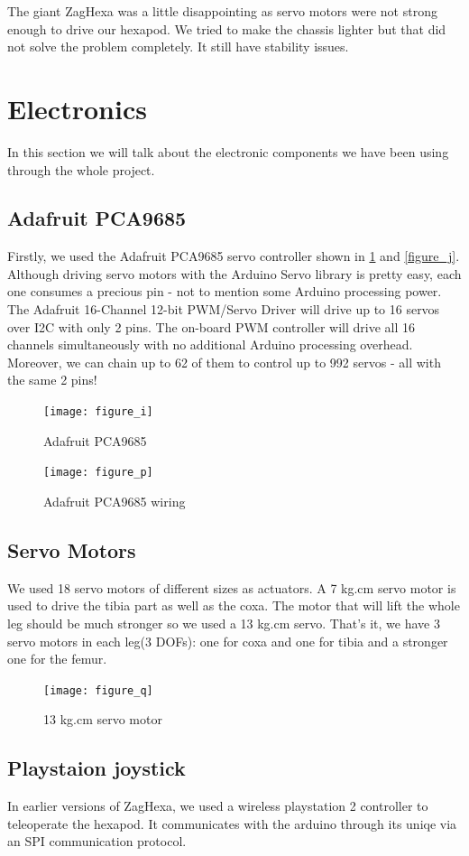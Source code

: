 The giant ZagHexa was a little disappointing as servo motors were not strong enough to drive our hexapod. We tried to make the chassis lighter but that did not solve the problem completely. It still have stability issues.

\section{Electronics}
In this section we will talk about the electronic components we have been using through the whole project.
\subsection{Adafruit PCA9685}
Firstly, we used the Adafruit PCA9685 servo controller shown in \ref{figure_i} and \ref{figure_j}. Although driving servo motors with the Arduino Servo library is pretty easy, each one consumes a precious pin - not to mention some Arduino processing power.  The Adafruit 16-Channel 12-bit PWM/Servo Driver will drive up to 16 servos over I2C with only 2 pins.  The on-board PWM controller will drive all 16 channels simultaneously with no additional Arduino processing overhead.  Moreover, we can chain up to 62 of them to control up to 992 servos - all with the same 2 pins!
\begin{figure}[H]
	\centering
	\texttt{[image: figure\_i]}
	\caption{Adafruit PCA9685}
	\label{figure_i}
\end{figure}
\begin{figure}[H]
	\centering
	\texttt{[image: figure\_p]}
	\caption{Adafruit PCA9685 wiring}
	\label{figure_p}
\end{figure}
\subsection{Servo Motors}
We used 18 servo motors of different sizes as actuators. A 7 kg.cm servo motor is used to drive the tibia part as well as the coxa. The motor that will lift the whole leg should be much stronger so we used a 13 kg.cm servo. That's it, we have 3 servo motors in each leg(3 DOFs): one for coxa and one for tibia and a stronger one for the femur.

\begin{figure}[H]
	\centering
	\texttt{[image: figure\_q]}
	\caption{13 kg.cm servo motor}
	\label{figure_q}
\end{figure}

\subsection{Playstaion joystick}
In earlier versions of ZagHexa, we used a wireless playstation 2 controller to teleoperate the hexapod. It communicates with the arduino through its uniqe via an SPI communication protocol.

